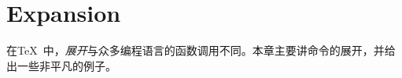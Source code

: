 \documentclass{book}
\begin{document}
\chapter{Expansion}\label{expand}

在\TeX\ 中，\emph{展开}与众多编程语言的函数调用不同。本章主要讲命令的展开，并给出一些非平凡的例子。

\label{cschap:relax}\label{cschap:expandafter}\label{cschap:noexpand}\label{cschap:afterassignment}\label{cschap:the}
\end{document}
